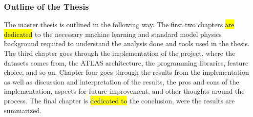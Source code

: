 \subsubsection*{Outline of the Thesis}
The master thesis is outlined in the following way. The first two chapters \hl{are dedicated} to the necessary machine learning and
standard model physics background required to understand the analysis done and tools used in the thesis. The third chapter goes 
through the implementation of the project, where the datasets comes from, the ATLAS architecture, the programming libraries, 
feature choice, and so on. Chapter four goes through the results from the implementation as well as discussion and 
interpretation of the results, the pros and cons of the implementation, aspects for future improvement, and other thoughts around the process.
The final chapter is \hl{dedicated to} the conclusion, were the results are summarized. 


